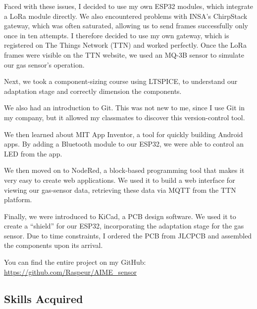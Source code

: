 Faced with these issues, I decided to use my own ESP32 modules, which integrate a LoRa module directly. We also encountered problems with INSA's ChirpStack gateway, which was often saturated, allowing us to send frames successfully only once in ten attempts. I therefore decided to use my own gateway, which is registered on The Things Network (TTN) and worked perfectly. Once the LoRa frames were visible on the TTN website, we used an MQ-3B sensor to simulate our gas sensor's operation.

Next, we took a component-sizing course using LTSPICE, to understand our adaptation stage and correctly dimension the components.

We also had an introduction to Git. This was not new to me, since I use Git in my company, but it allowed my classmates to discover this version-control tool.

We then learned about MIT App Inventor, a tool for quickly building Android apps. By adding a Bluetooth module to our ESP32, we were able to control an LED from the app.

We then moved on to NodeRed, a block-based programming tool that makes it very easy to create web applications. We used it to build a web interface for viewing our gas-sensor data, retrieving these data via MQTT from the TTN platform.

Finally, we were introduced to KiCad, a PCB design software. We used it to create a “shield” for our ESP32, incorporating the adaptation stage for the gas sensor. Due to time constraints, I ordered the PCB from JLCPCB and assembled the components upon its arrival.

You can find the entire project on my GitHub: \url{https://github.com/Raspeur/AIME_sensor}

\subsection{Skills Acquired}

